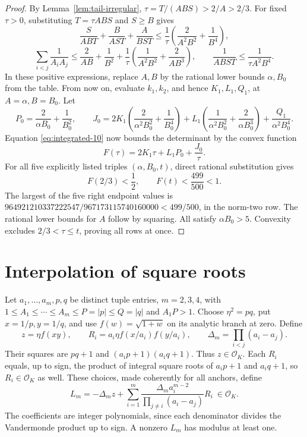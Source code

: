 \documentclass[12pt]{article}
\numberwithin{equation}{section}
\begin{document}
\begin{proof}
By Lemma~\ref{lem:tail-irregular},
\(\tau=T/(ABS)>2/A>2/3\).
For fixed \(\tau>0\), substituting \(T=\tau ABS\) and \(S\ge B\) gives
\[
 \frac{S}{ABT}+\frac{B}{AST}+\frac{A}{BST}
 \le\frac1\tau\left(\frac2{A^2B^2}+\frac1{B^4}\right),
\]
\[
 \sum_{i<j}\frac1{A_iA_j}
 \le\frac2{AB}+\frac1{B^2}
       +\frac1\tau\left(\frac1{A^2B^2}+\frac2{AB^3}\right),
 \qquad
 \frac1{ABST}\le\frac1{\tau A^2B^4}.
\]
In these positive expressions, replace \(A,B\) by the rational lower
bounds \(\alpha,B_0\) from the table. From now on, evaluate \(k_1,k_2\),
and hence \(K_1,L_1,Q_1\), at \(A=\alpha,B=B_0\). Let
\[
 P_0=\frac2{\alpha B_0}+\frac1{B_0^2},\qquad
 J_0=2K_1\left(\frac2{\alpha^2B_0^2}+\frac1{B_0^4}\right)
 +L_1\left(\frac1{\alpha^2B_0^2}+\frac2{\alpha B_0^3}\right)
 +\frac{Q_1}{\alpha^2B_0^4}.
\]
Equation \eqref{eq:integrated-10} now bounds the determinant by the convex function
\[
 F(\tau)=2K_1\tau+L_1P_0+\frac{J_0}{\tau}.
\]
For all five explicitly listed triples \((\alpha,B_0,t)\), direct rational
substitution gives
\[
 F(2/3)<\frac12,\qquad F(t)<\frac{499}{500}<1.
\]
The largest of the five right endpoint values is
\(964921210337222547/967173115740160000<499/500\),
in the norm-two row. The rational lower bounds for \(A\) follow by squaring.
All satisfy \(\alpha B_0>5\).
Convexity excludes \(2/3<\tau\le t\), proving all rows at once.
\end{proof}

\section{Interpolation of square roots}\label{sec:coherent-interpolation}

Let \(a_1,\ldots,a_m,p,q\) be distinct tuple entries, \(m=2,3,4\), with
\(1\le A_1\le\cdots\le A_m\le P=|p|\le Q=|q|\) and \(A_1P>1\).
Choose \(\eta^2=pq\), put \(x=1/p,y=1/q\), and use
\(f(w)=\sqrt{1+w}\) on its analytic branch at zero. Define
\[
 z=\eta f(xy),\qquad
 R_i=a_i\eta f(x/a_i)f(y/a_i),\qquad
 \Delta_m=\prod_{i<j}(a_i-a_j).
\]
Their squares are \(pq+1\) and \((a_ip+1)(a_iq+1)\).
Thus \(z\in\mathcal O_K\). Each \(R_i\) equals, up to sign, the
product of integral square roots of \(a_ip+1\) and \(a_iq+1\), so
\(R_i\in\mathcal O_K\) as well. These choices,
made coherently for all anchors, define
\begin{equation}\label{eq:coherent-form}
 L_m=-\Delta_m z+
 \sum_{i=1}^m
 \frac{\Delta_m a_i^{m-2}}{\prod_{j\ne i}(a_i-a_j)}R_i
 \ \in\mathcal O_K.
\end{equation}
The coefficients are integer polynomials, since each denominator divides
the Vandermonde product up to sign. A nonzero \(L_m\) has modulus at least one.
\end{document}
